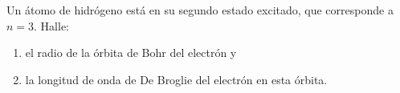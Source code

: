 \item Un átomo de hidrógeno está en su segundo estado excitado, que corresponde a $n = 3$. Halle:
\begin{enumerate}
    \item el radio de la órbita de Bohr del electrón y
    \item la longitud de onda de De Broglie del electrón en esta órbita.
\end{enumerate}